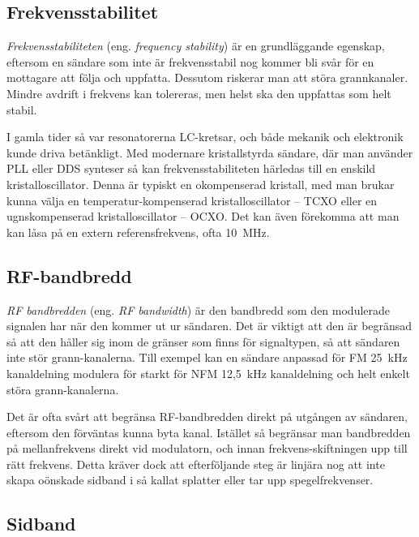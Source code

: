 \subsection{Frekvensstabilitet}

\emph{Frekvensstabiliteten} (eng. \emph{frequency stability}) är en
grundläggande egenskap, eftersom en sändare som inte är frekvensstabil nog
kommer bli svår för en mottagare att följa och uppfatta.
Dessutom riskerar man att störa grannkanaler.
Mindre avdrift i frekvens kan tolereras, men helst ska den uppfattas som
helt stabil.

I gamla tider så var resonatorerna LC-kretsar, och både mekanik och elektronik
kunde driva betänkligt.
Med modernare kristallstyrda sändare, där man använder PLL eller DDS
synteser så kan frekvensstabiliteten härledas till en enskild
kristalloscillator.
Denna är typiskt en okompenserad kristall, med man brukar kunna välja en
temperatur-kompenserad kristalloscillator -- TCXO eller en ugnskompenserad
kristalloscillator -- OCXO.
Det kan även förekomma att man kan låsa på en extern referensfrekvens,
ofta 10~MHz.

\subsection{RF-bandbredd}

\emph{RF bandbredden} (eng. \emph{RF bandwidth}) är den bandbredd som den
modulerade signalen har när den kommer ut ur sändaren.
Det är viktigt att den är begränsad så att den håller sig inom de gränser
som finns för signaltypen, så att sändaren inte stör grann-kanalerna.
Till exempel kan en sändare anpassad för FM 25~kHz kanaldelning modulera för starkt för
NFM 12,5~kHz kanaldelning och helt enkelt störa grann-kanalerna.

Det är ofta svårt att begränsa RF-bandbredden direkt på utgången av sändaren,
eftersom den förväntas kunna byta kanal.
Istället så begränsar man bandbredden på mellanfrekvens direkt vid modulatorn,
och innan frekvens-skiftningen upp till rätt frekvens.
Detta kräver dock att efterföljande steg är linjära nog att inte skapa oönskade
sidband i så kallat splatter eller tar upp spegelfrekvenser.

\subsection{Sidband}

